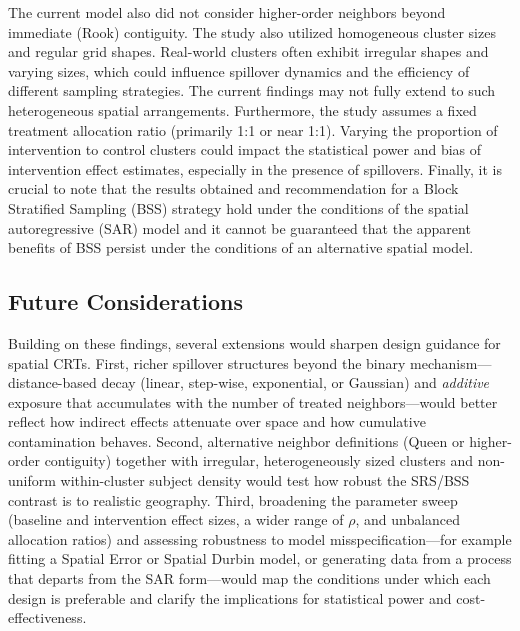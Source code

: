 \documentclass{article}[11pt]
\begin{document}
The current model also did not consider higher-order neighbors beyond immediate (Rook) contiguity. The study also utilized homogeneous cluster sizes and regular grid shapes. Real-world clusters often exhibit irregular shapes and varying sizes, which could influence spillover dynamics and the efficiency of different sampling strategies. The current findings may not fully extend to such heterogeneous spatial arrangements. Furthermore, the study assumes a fixed treatment allocation ratio (primarily 1:1 or near 1:1). Varying the proportion of intervention to control clusters could impact the statistical power and bias of intervention effect estimates, especially in the presence of spillovers. Finally, it is crucial to note that the results obtained and recommendation for a Block Stratified Sampling (BSS) strategy hold under the conditions of the spatial autoregressive (SAR) model and it cannot be guaranteed that the apparent benefits of BSS persist under the conditions of an alternative spatial model.

\subsection{Future Considerations}

Building on these findings, several extensions would sharpen design guidance for spatial CRTs. First, richer spillover structures beyond the binary mechanism---distance-based decay (linear, step-wise, exponential, or Gaussian) and \emph{additive} exposure that accumulates with the number of treated neighbors---would better reflect how indirect effects attenuate over space and how cumulative contamination behaves. Second, alternative neighbor definitions (Queen or higher-order contiguity) together with irregular, heterogeneously sized clusters and non-uniform within-cluster subject density would test how robust the SRS/BSS contrast is to realistic geography. Third, broadening the parameter sweep (baseline and intervention effect sizes, a wider range of $\rho$, and unbalanced allocation ratios) and assessing robustness to model misspecification---for example fitting a Spatial Error or Spatial Durbin model, or generating data from a process that departs from the SAR form---would map the conditions under which each design is preferable and clarify the implications for statistical power and cost-effectiveness.
\end{document}
